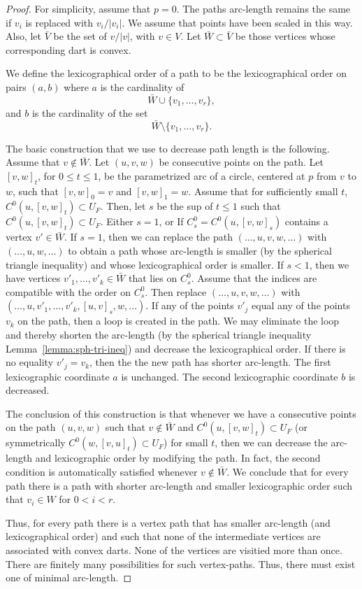 \begin{proof}  For simplicity, assume that $p=0$.
The paths arc-length remains the same if $v_i$ is replaced with $v_i/|v_i|$.
We assume that points have been scaled in this way.  Also, let $\bar V$ be
the set of $v/|v|$, with $v\in V$.  Let $\bar W\subset \bar V$ be those
vertices whose corresponding dart is convex.

We define the lexicographical order of a path to be the lexicographical order on
pairs
   $(a,b)$
where $a$ is the cardinality of
   $$\bar W \cup \{v_1,\ldots,v_r\},$$
and $b$ is the cardinality of the set
   $$\bar W \setminus \{v_1,\ldots,v_r\}.$$

The basic construction that we use to decrease path length is the following.
Assume that $v\not\in \bar W$.
Let $(u,v,w)$ be consecutive points on the path.  Let $[v,w]_t$,
for $0\le t\le 1$, be the parametrized arc
of a circle, centered at $p$ from $v$ to $w$, such that $[v,w]_0=v$ and $[v,w]_1=w$.
Assume that for sufficiently small $t$, $C^0(u,[v,w]_t)\subset U_F$.
Then, let $s$ be the sup of $t\le 1$ such that $C^0(u,[v,w]_t)\subset U_F$.
Either $s=1$, or 
If $C^0_s=C^0(u,[v,w]_s)$ contains a vertex $v'\in \bar W$.
If $s=1$, then we can replace the path
$(\ldots,u,v,w,\ldots)$ with $(\ldots,u,w,\ldots)$ to obtain a path whose
arc-length is smaller (by the spherical triangle inequality) and whose 
lexicographical order is smaller.
If $s<1$, then we have vertices $v'_1,\ldots,v'_k\in \bar W$ that lies on $C^0_s$.
Assume that the indices are compatible with the order on $C^0_s$.
Then replace $(\ldots,u,v,w,\ldots)$ with
$(\ldots,u,v'_1,\ldots,v'_k,[u,v]_s,w,\ldots)$.  If any of the points $v'_j$
equal any of the points $v_k$ on the path, then a loop is created in the path.
We may eliminate the loop and thereby shorten the arc-length
(by the spherical triangle inequality Lemma~\ref{lemma:sph-tri-ineq}) and decrease the 
lexicographical order.  If there is no equality $v'_j=v_k$, then the the new
path has shorter arc-length.  The first lexicographic coordinate $a$ is unchanged.
The second lexicographic coordinate $b$ is decreased.

The conclusion of this construction is that whenever we have a consecutive
points on the path $(u,v,w)$ such that $v\not\in \bar W$ and $C^0(u,[v,w]_t)\subset U_F$ (or
symmetrically $C^0(w,[v,u]_t)\subset U_F$) for small $t$, then we can decrease
the arc-length and lexicographic order by modifying the path.
In fact, the second condition is automatically satisfied whenever $v\not\in \bar W$.
We conclude that for every path there is a path with shorter arc-length and
smaller lexicographic order such that
$v_i\in W$ for $0 < i < r$.  

Thus, for every path there is a vertex path that has smaller arc-length 
(and lexicographical order)
and
such that none of the intermediate vertices are associated with  convex darts.
None of the vertices are visitied more than once.
There are finitely many possibilities for such vertex-paths.  Thus, there
must exist one of minimal arc-length.
\end{proof}


